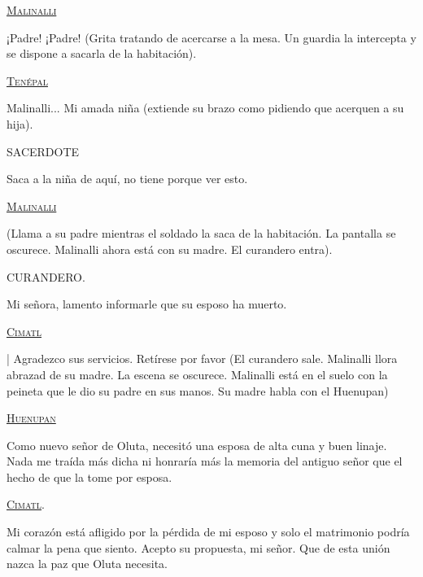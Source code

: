 \documentclass[11pt,letterpaper]{article}
\begin{document}
\begin{center}
\textsc{\underline{Malinalli}}
\\
\par
¡Padre! ¡Padre! (Grita tratando de acercarse a la mesa. Un guardia la intercepta y se dispone a sacarla de la habitación). 
\\
\par
\textsc{\underline{Tenépal}}
\\
\par
Malinalli... Mi amada niña (extiende su brazo como pidiendo que acerquen a su hija).
\\
\par
SACERDOTE
\\
\par
Saca a la niña de aquí, no tiene porque ver esto.
\\
\par
\textsc{\underline{Malinalli}}
\\
\par
(Llama a su padre mientras el soldado la saca de la habitación. La pantalla se oscurece. Malinalli ahora está con su madre. El curandero entra).
\\
\par
CURANDERO.
\\
\par
Mi señora, lamento informarle que su esposo ha muerto.
\\
\par
\textsc{\underline{Cimatl}}
\\
\par|
Agradezco sus servicios. Retírese por favor (El curandero sale. Malinalli llora abrazad de su madre. La escena se oscurece. Malinalli está en el suelo con la peineta que le dio su padre en sus manos. Su madre habla con el Huenupan)
\\
\par
\textsc{\underline{Huenupan}}
\\
\par
Como nuevo señor de Oluta, necesitó una esposa de alta cuna y buen linaje. Nada me traída más dicha ni honraría más la memoria del antiguo señor que el hecho de que la tome por esposa.
\\
\par
\textsc{\underline{Cimatl}}.
\\
\par
Mi corazón está afligido por la pérdida de mi esposo y solo el matrimonio podría calmar la pena que siento. Acepto su propuesta, mi señor. Que de esta unión nazca la paz que Oluta necesita.
\end{center}
\end{document}
